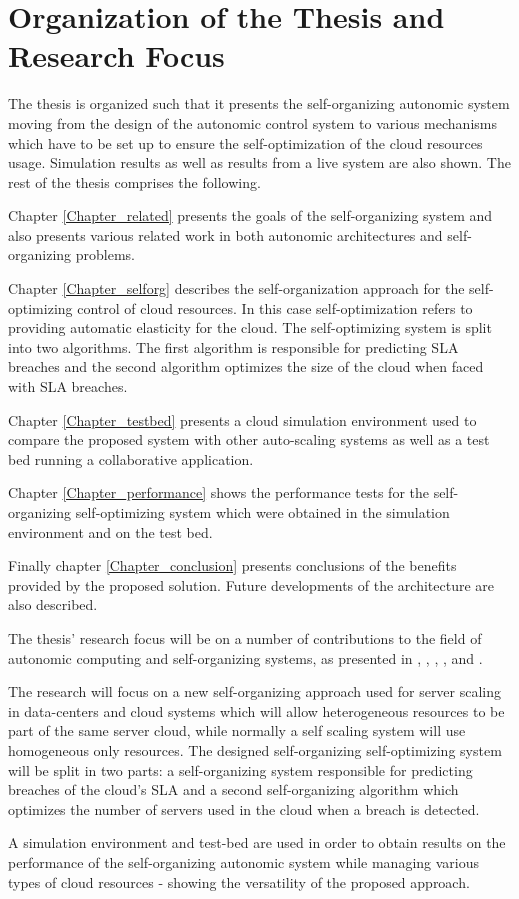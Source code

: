 \section{Organization of the Thesis and Research Focus}

The thesis is organized such that it presents the self-organizing autonomic system moving from the design of the autonomic control system to various mechanisms which have to be set up to ensure the self-optimization of the cloud resources usage. Simulation results as well as results from a live system are also shown. The rest of the thesis comprises the following.

Chapter \ref{Chapter_related} presents the goals of the self-organizing system and also presents various related work in both autonomic architectures and self-organizing problems.

Chapter \ref{Chapter_selforg} describes the self-organization approach for the self-optimizing control of cloud resources. In this case self-optimization refers to providing automatic elasticity for the cloud. The self-optimizing system is split into two algorithms. The first algorithm is responsible for predicting SLA breaches and the second algorithm optimizes the size of the cloud when faced with SLA breaches.

Chapter \ref{Chapter_testbed} presents a cloud simulation environment used to compare the proposed system with other auto-scaling systems as well as a test bed running a collaborative application.

Chapter \ref{Chapter_performance} shows the performance tests for the self-organizing self-optimizing system which were obtained in the simulation environment and on the test bed.

Finally chapter \ref{Chapter_conclusion} presents conclusions of the benefits provided by the proposed solution. Future developments of the architecture are also described.

The thesis' research focus will be on a number of contributions to the field of autonomic computing and self-organizing systems, as presented in \cite{bogdan:lindi}, \cite{bogdan:amgcc2013}, \cite{bogdan:cts2012}, \cite{bogdan:conti2010}, \cite{bogdan:saci2013} and \cite{bogdan:miles2012chapter}. 

The research will focus on a new self-organizing approach used for server scaling in data-centers and cloud systems which will allow heterogeneous resources to be part of the same server cloud, while normally a self scaling system will use homogeneous only resources. The designed self-organizing self-optimizing system will be split in two parts: a self-organizing system responsible for predicting breaches of the cloud's SLA and a second self-organizing algorithm which optimizes the number of servers used in the cloud when a breach is detected.

A simulation environment and test-bed are used in order to obtain results on the performance of the self-organizing autonomic system while managing various types of cloud resources - showing the versatility of the proposed approach.